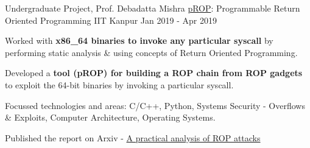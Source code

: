 \begin{cventries}





  \cventry
    {Undergraduate Project, Prof. Debadatta Mishra} %
    {\href{https://arxiv.org/abs/2111.03537}{pROP}: Programmable Return Oriented Programming} %
    {IIT Kanpur} %
    {Jan 2019 - Apr 2019} %
    {
      \begin{cvitems} %
      \item {Worked with \textbf{x86\_64 binaries to invoke any particular syscall} by performing static analysis \& using concepts of Return Oriented Programming.}
      \item {Developed a \textbf{tool (pROP) for building a ROP chain from ROP gadgets} to exploit the 64-bit binaries by invoking a particular syscall.}
      \item {Focussed technologies and areas: C/C++, Python, Systems Security - Overflows \& Exploits, Computer Architecture, Operating Systems.}
      \item {Published the report on Arxiv - \href{https://arxiv.org/abs/2111.03537}{A practical analysis of ROP attacks}}
      \end{cvitems}
    }





\end{cventries}
